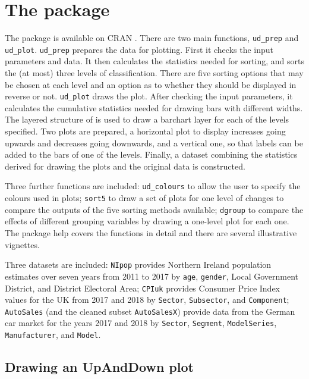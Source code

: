 \hypertarget{the-package}{%
\section{The package}\label{the-package}}

The  package is available on CRAN \citep{unwin:2024u}. There are two main functions, \texttt{ud\_prep} and \texttt{ud\_plot}. \texttt{ud\_prep} prepares the data for plotting. First it checks the input parameters and data. It then calculates the statistics needed for sorting, and sorts the (at most) three levels of classification. There are five sorting options that may be chosen at each level and an option as to whether they should be displayed in reverse or not. \texttt{ud\_plot} draws the plot. After checking the input parameters, it calculates the cumulative statistics needed for drawing bars with different widths. The layered structure of  is used to draw a barchart layer for each of the levels specified. Two plots are prepared, a horizontal plot to display increases going upwards and decreases going downwards, and a vertical one, so that labels can be added to the bars of one of the levels. Finally, a dataset combining the statistics derived for drawing the plots and the original data is constructed.

Three further functions are included: \texttt{ud\_colours} to allow the user to specify the colours used in plots; \texttt{sort5} to draw a set of plots for one level of changes to compare the outputs of the five sorting methods available; \texttt{dgroup} to compare the effects of different grouping variables by drawing a one-level plot for each one. The package help covers the functions in detail and there are several illustrative vignettes.

Three datasets are included: \texttt{NIpop} provides Northern Ireland population estimates over seven years from 2011 to 2017 by \texttt{age}, \texttt{gender}, Local Government District, and District Electoral Area; \texttt{CPIuk} provides Consumer Price Index values for the UK from 2017 and 2018 by \texttt{Sector}, \texttt{Subsector}, and \texttt{Component}; \texttt{AutoSales} (and the cleaned subset \texttt{AutoSalesX}) provide data from the German car market for the years 2017 and 2018 by \texttt{Sector}, \texttt{Segment}, \texttt{ModelSeries}, \texttt{Manufacturer}, and \texttt{Model}.

\hypertarget{drawing-an-upanddown-plot}{%
\subsection{Drawing an UpAndDown plot}\label{drawing-an-upanddown-plot}}

